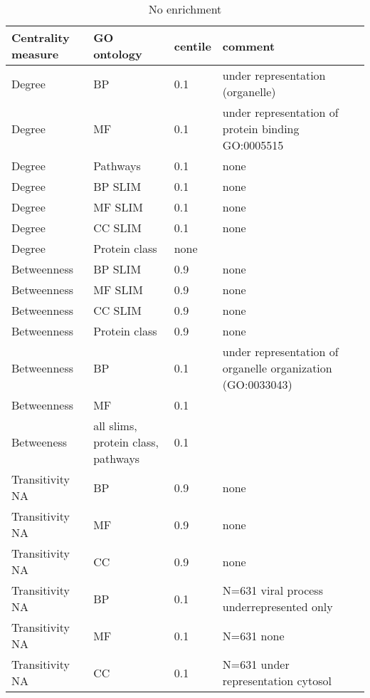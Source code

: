 \begin{table}[]
    \centering
    \begin{adjustbox}{width=\textwidth}
    
    \begin{tabular}{lllll}
    \toprule
    Centrality measure & GO ontology & centile & comment \\
    \midrule
     Degree   &  BP &  0.1 & under representation (organelle) \\
     Degree    & MF & 0.1 &  under representation of protein binding GO:0005515\\
     Degree & Pathways & 0.1 & none\\
     Degree & BP SLIM & 0.1 & none \\
     Degree & MF SLIM & 0.1 & none \\
     Degree & CC SLIM & 0.1 & none \\
     Degree & Protein class & none \\
     Betweenness & BP SLIM & 0.9 & none \\
      Betweenness & MF SLIM & 0.9 & none \\
      Betweenness & CC SLIM & 0.9 & none \\
      Betweenness & Protein class & 0.9 & none \\
     Betweenness & BP & 0.1 & under representation of organelle organization (GO:0033043)\\
     Betweenness & MF & 0.1 & \\
     Betweeness & all slims, protein class, pathways & 0.1 &\\
     Transitivity NA & BP & 0.9 & none \\
     Transitivity NA & MF & 0.9 & none \\
     Transitivity NA & CC & 0.9 & none \\
     Transitivity NA & BP & 0.1 & N=631 viral process underrepresented only\\
     Transitivity NA & MF & 0.1 & N=631 none\\
     Transitivity NA & CC & 0.1 & N=631 under representation cytosol\\
     \bottomrule
    \end{tabular}
    \end{adjustbox}
    \caption{No enrichment}
    \label{tab:GO analysis noenrich}
\end{table}


